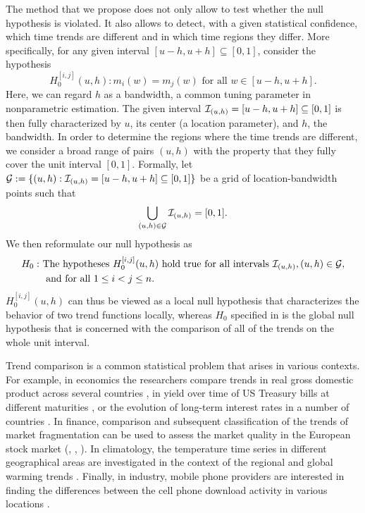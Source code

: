 \documentclass[a4paper,12pt]{article}
\makeatletter
\renewcommand{\eqref}[1]{\tagform@{\ref{#1}}}
\makeatother
\begin{document}
The method that we propose does not only allow to test whether the null hypothesis is violated. It also allows to detect, with a given statistical confidence, which time trends are different and in which time regions they differ. More specifically, for any given interval $[u-h,u+h] \subseteq [0,1]$, consider the hypothesis
\[ H_0^{[i,j]}(u,h): m_i(w) = m_j(w) \text{ for all } w \in [u-h,u+h]. \] 
Here, we can regard $h$ as a bandwidth, a common tuning parameter in nonparametric estimation. The given interval $\mathcal{I}_{(u, h)} = [u-h,u+h] \subseteq [0,1]$ is then fully characterized by $u$, its center (a location parameter), and $h$, the bandwidth. In order to determine the regions where the time trends are different, we consider a broad range of pairs $(u, h)$ with the property that they fully cover the unit interval $[0, 1]$. Formally, let \linebreak $\mathcal{G} := \{(u, h): \mathcal{I}_{(u, h)} = [u-h, u+h] \subseteq [0,1]\}$ be a grid of location-bandwidth points such that 
\begin{align*}
\bigcup_{(u, h) \in \mathcal{G}}  \mathcal{I}_{(u, h)} = [0,1].
\end{align*}
We then reformulate our null hypothesis \eqref{eq:null} as
\begin{align*}
H_0: \ & \text{The hypotheses } H_0^{[i,j]}(u,h) \text{ hold true for all intervals }  \mathcal{I}_{(u, h)}, (u, h) \in \mathcal{G}, \\ & \text{ and for all } 1 \le i < j \le n. 
\end{align*} 
$H_0^{[i,j]}(u,h)$ can thus be viewed as a local null hypothesis that characterizes the behavior of two trend functions locally, whereas $H_0$ specified in \eqref{eq:null} is the global null hypothesis that is concerned with the comparison of all of the trends on the whole unit interval.

Trend comparison is a common statistical problem that arises in various contexts. For example, in economics the researchers compare trends in real gross domestic product across several countries \citep[][]{Grier1989}, in yield over time of US Treasury bills at different maturities \citep[][]{Park2009}, or the evolution of long-term interest rates in a number of countries \citep[][]{Christiansen1997}. In finance, comparison and subsequent classification of the trends of market fragmentation can be used to assess the market quality in the European stock market (\citeauthor{VogtLinton2017}, \citeyear{VogtLinton2017}, \citeyear{VogtLinton2020}). In climatology, the temperature time series in different geographical areas are investigated in the context of the regional and global warming trends \citep[][]{KarolyWu2005}. Finally, in industry, mobile phone providers are interested in finding the differences between the cell phone download activity in various locations \citep[][]{DegrasWu2012}.
\end{document}
